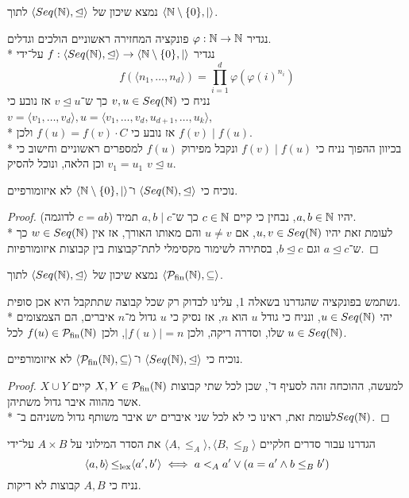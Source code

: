 \Subquestion{}
נמצא שיכון של $\langle Seq(\mathbb{N}), \trianglelefteq \rangle$ לתוך $\langle \mathbb{N} \setminus \{ 0 \}, \mid \rangle$.

נגדיר $\varphi : \mathbb{N} \to \mathbb{N}$ פונקציה המחזירה ראשוניים הולכים וגדלים. \\*
נגדיר $f : \langle Seq(\mathbb{N}), \trianglelefteq \rangle \to \langle \mathbb{N} \setminus \{ 0 \}, \mid \rangle$ על־ידי
\[
	f(\langle n_1, \dots, n_d \rangle) = \prod_{i = 1}^d \varphi({\varphi(i)}^{n_i})
\]
נניח כי $v, u \in Seq(\mathbb{N})$ כך ש־$v \trianglelefteq u$ אז נובע כי $v = \langle v_1, \dots, v_d \rangle, u = \langle v_1, \dots, v_d, u_{d + 1}, \dots, u_k \rangle$, \\*
אז נובע כי $f(u) = f(v) \cdot C$ ולכן $f(v) \mid f(u)$. \\*
בכיוון ההפוך נניח כי $f(v) \mid f(u)$ ונקבל מפירוק $f(u)$ למספרים ראשוניים וחישוב כי $v_1 = u_1$ וכן הלאה, ונוכל להסיק $v \trianglelefteq u$.

\Subquestion{}
נוכיח כי $\langle Seq(\mathbb{N}), \trianglelefteq \rangle$ ו־$\langle \mathbb{N} \setminus \{ 0 \}, \mid \rangle$ לא איזומורפיים.
\begin{proof}
	יהיו $a, b \in \mathbb{N}$, נבחין כי קיים $c \in \mathbb{N}$ כך ש־$a, b \mid c$ תמיד ($c = ab$ לדוגמה). \\*
	לעומת זאת יהיו $u, v \in Seq(\mathbb{N})$, אם $u \ne v$ והם מאותו האורך, אז אין $w \in Seq(\mathbb{N})$ כך ש־$a \trianglelefteq c$ וגם $b \trianglelefteq c$, בסתירה לשימור מקסימלי לתת־קבוצות בין קבוצות איזומורפיות.
\end{proof}

\Subquestion{}
נמצא שיכון של $\langle Seq(\mathbb{N}), \trianglelefteq \rangle$ לתוך $\langle \operatorname{\mathcal{P}_\text{fin}}(\mathbb{N}), \subseteq\rangle$.

נשתמש בפונקציה שהגדרנו בשאלה 1, עלינו לבדוק רק שכל קבוצה שתתקבל היא אכן סופית. \\*
יהי $u \in Seq(\mathbb{N})$, ונניח כי גודל $u$ הוא $n$, אז נסיק כי $u$ גדול מ־$n$ איברים, הם הצמצומים שלו, וסדרה ריקה, ולכן $|f(u)| = n$, ולכן $f(u) \in \operatorname{\mathcal{P}_\text{fin}}(\mathbb{N})$ לכל $u \in Seq(\mathbb{N})$.

\Subquestion{}
נוכיח כי $\langle Seq(\mathbb{N}), \trianglelefteq \rangle$ ו־$\langle \operatorname{\mathcal{P}_\text{fin}}(\mathbb{N}), \subseteq\rangle$ לא איזומורפיים.
\begin{proof}
	למעשה, ההוכחה זהה לסעיף ד', שכן לכל שתי קבוצות $X, Y \in \operatorname{\mathcal{P}_\text{fin}}(\mathbb{N})$ קיים $X \cup Y$ אשר מהווה איבר גדול משתיהן. \\*
	לעומת זאת, ראינו כי לא לכל שני איברים יש איבר משותף גדול משניהם ב־$Seq(\mathbb{N})$.
\end{proof}

\Question{}
הגדרנו עבור סדרים חלקיים $\langle A, \le_A \rangle, \langle B, \le_B \rangle$ את הסדר המילוני על $A \times B$ על־ידי
\[
	\langle a, b \rangle \operatorname{\le_\text{lex}} \langle a', b' \rangle \iff a <_A a' \lor (a = a' \land b \le_B b')
\]
נניח כי $A, B$ קבוצות לא ריקות.

